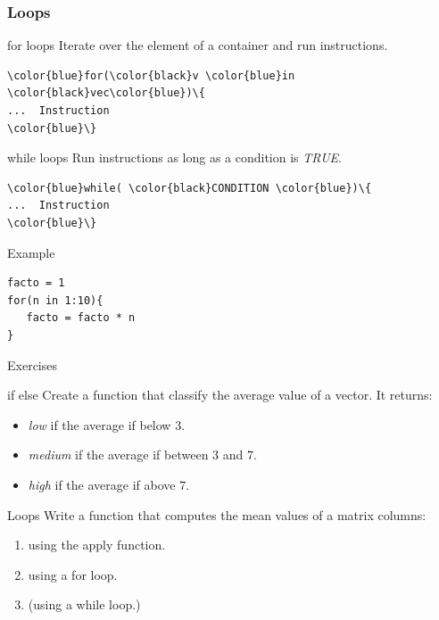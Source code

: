 \documentclass[10pt]{beamer}
\newenvironment{xframe}[2][]
  {\begin{frame}[fragile,environment=xframe,#1]
  \frametitle{#2}}
  {\end{frame}}
\begin{document}
\begin{xframe}{Loops}
  \begin{block}{{\sf for} loops}
    Iterate over the element of a container and run instructions.
\begin{Verbatim}[commandchars=\\\{\}]
\color{blue}for(\color{black}v \color{blue}in \color{black}vec\color{blue})\{
...  Instruction
\color{blue}\}
\end{Verbatim}  
  \end{block}
  \begin{block}{{\sf while} loops}
    Run instructions as long as a condition is {\it TRUE}.
\begin{Verbatim}[commandchars=\\\{\}]
\color{blue}while( \color{black}CONDITION \color{blue})\{
...  Instruction
\color{blue}\}
\end{Verbatim}  
  \end{block}
  \begin{exampleblock}{Example}
\begin{verbatim}
facto = 1
for(n in 1:10){
   facto = facto * n
}
\end{verbatim}  
  \end{exampleblock}
\end{xframe}


\begin{frame}{Exercises}
  \begin{block}{{\sf if else}}
    Create a function that classify the average value of a {\sf vector}. It returns:
    \begin{itemize}
    \item {\it low} if the average if below $3$.
    \item {\it medium} if the average if between $3$ and $7$.
    \item {\it high} if the average if above $7$.
    \end{itemize}
  \end{block}
  
  \bigskip
  
  \begin{block}{Loops}
    Write a function that computes the mean values of a matrix columns:
    \begin{enumerate}
    \item using the {\sf apply}  function.
    \item using a {\sf for} loop.
    \item (using a {\sf while} loop.)
    \end{enumerate}
  \end{block}
\end{frame}
\end{document}
